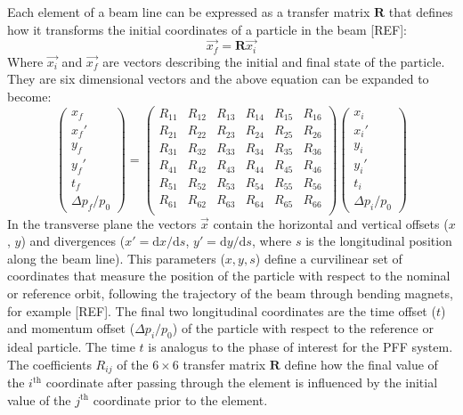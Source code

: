 Each element of a beam line can be expressed as a transfer matrix \(\mathbf{R}\) that defines how it transforms the initial coordinates of a particle in the beam [REF]:
\begin{equation}
\vec{x_f} = \mathbf{R}\vec{x_i}
\end{equation}
Where \(\vec{x_i}\) and \(\vec{x_f}\) are vectors describing the initial and final state of the particle. They are six dimensional vectors and the above equation can be expanded to become:
\begin{equation}
\left( \begin{array}{c} x_f \\ x_f' \\ y_f \\ y_f' \\ t_f \\ \Delta p_f/p_0 \end{array} \right)
=
\left( \begin{array}{cccccc} 
R_{11} & R_{12} & R_{13} & R_{14} & R_{15} & R_{16}\\ 
R_{21} & R_{22} & R_{23} & R_{24}  & R_{25} & R_{26}\\ 
R_{31} & R_{32} & R_{33} & R_{34}  & R_{35} & R_{36}\\
R_{41} & R_{42} & R_{43} & R_{44}  & R_{45} & R_{46}\\
R_{51} & R_{52} & R_{53} & R_{54}  & R_{55} & R_{56}\\
R_{61} & R_{62} & R_{63} & R_{64}  & R_{65} & R_{66}\\
\end{array} \right)
\left( \begin{array}{c} x_i \\ x_i' \\ y_i \\ y_i' \\ t_i \\ \Delta p_i/p_0 \end{array} \right)
\end{equation}
In the transverse plane the vectors \(\vec{x}\) contain the horizontal and vertical offsets (\(x\), \(y\)) and divergences (\(x' = \mathrm{d}x/\mathrm{d}s\), \(y' = \mathrm{d}y/\mathrm{d}s\), where \(s\) is the longitudinal position along the beam line). This parameters (\(x, y, s\)) define a curvilinear set of coordinates that measure the position of the particle with respect to the nominal or reference orbit, following the trajectory of the beam through bending magnets, for example [REF]. The final two longitudinal coordinates are the time offset (\(t\)) and momentum offset (\(\Delta p_i/p_0\)) of the particle with respect to the reference or ideal particle. The time \(t\) is analogus to the phase of interest for the PFF system. The coefficients \(R_{ij}\) of the \(6\times6\) transfer matrix \(\mathbf{R}\) define how the final value of the \(i^{\mathrm{th}}\) coordinate after passing through the element is influenced by the initial value of the \(j^{\mathrm{th}}\) coordinate prior to the element.

